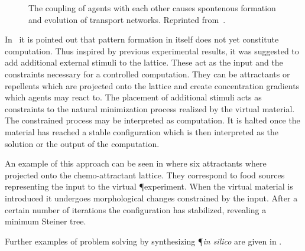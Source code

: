 			\begin{figure}
				\centering
				
				
				\caption[Multi-agent \P \ - Evolution of agents]{The coupling of agents with each other causes spontenous formation and evolution of transport networks. Reprinted from~\cite{jones2016multi}.}
				\label{fig:agent_evolution}
			\end{figure}

			In~\cite{jones2016multi} it is pointed out that pattern formation in itself does not yet constitute computation. Thus inspired by previous experimental results, it was suggested to add additional external stimuli to the lattice. These act as the input and the constraints necessary for a controlled computation. They can be attractants or repellents which are projected onto the lattice and create concentration gradients which agents may react to. The placement of additional stimuli acts as constraints to the natural minimization process realized by the virtual material. The constrained process may be interpreted as computation. It is halted once the material has reached a stable configuration which is then interpreted as the solution or the output of the computation.

			An example of this approach can be seen in  where six attractants where projected onto the chemo-attractant lattice. They correspond to food sources representing the input to the virtual \P experiment. When the virtual material is introduced it undergoes morphological changes constrained by the input. After a certain number of iterations the configuration has stabilized, revealing a minimum Steiner tree.

			Further examples of problem solving by synthesizing \P \emph{in silico} are given in .

